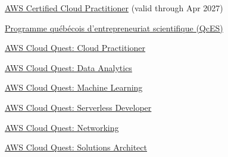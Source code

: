 
\begin{cvitems}
  \item {\href{https://www.credly.com/badges/b57717b2-640e-459b-be04-6de7062b1564}{AWS Certified Cloud Practitioner} (valid through Apr 2027)}
  \item {\href{https://verified.sertifier.com/fr/verify/37471918795197/}{Programme québécois d'entrepreneuriat scientifique (QcES)}}
  \item {\href{https://www.credly.com/badges/5f355856-1c00-4322-87db-b79af4919f54}{AWS Cloud Quest: Cloud Practitioner}}
  \item {\href{https://www.credly.com/badges/53058a73-f07d-4773-8a8c-4c6067bac2a7}{AWS Cloud Quest: Data Analytics}}
  \item {\href{https://www.credly.com/badges/85e788b1-b632-4396-8b21-2bc651eb43ea}{AWS Cloud Quest: Machine Learning}}
  \item {\href{https://www.credly.com/badges/3d3e6765-8c1b-4935-ae11-4cdf9ec780b8}{AWS Cloud Quest: Serverless Developer}}
  \item {\href{https://www.credly.com/badges/3c080879-5c3b-46d2-9f77-6479ece661f5}{AWS Cloud Quest: Networking}}
  \item {\href{https://www.credly.com/badges/a71d6cf3-b1ed-414f-855f-4a79d516e171}{AWS Cloud Quest: Solutions Architect}}
\end{cvitems}
